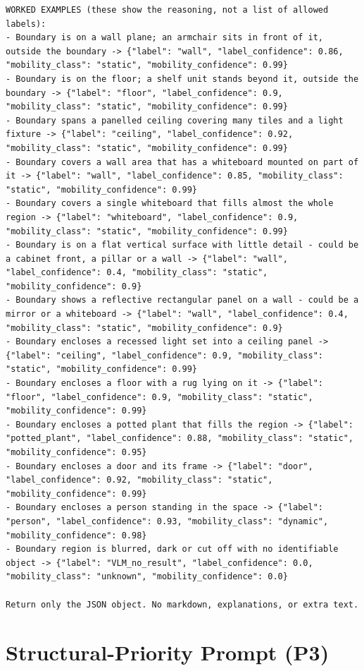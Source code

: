 \begin{lstlisting}[style=promptstyle]
WORKED EXAMPLES (these show the reasoning, not a list of allowed labels):
- Boundary is on a wall plane; an armchair sits in front of it, outside the boundary -> {"label": "wall", "label_confidence": 0.86, "mobility_class": "static", "mobility_confidence": 0.99}
- Boundary is on the floor; a shelf unit stands beyond it, outside the boundary -> {"label": "floor", "label_confidence": 0.9, "mobility_class": "static", "mobility_confidence": 0.99}
- Boundary spans a panelled ceiling covering many tiles and a light fixture -> {"label": "ceiling", "label_confidence": 0.92, "mobility_class": "static", "mobility_confidence": 0.99}
- Boundary covers a wall area that has a whiteboard mounted on part of it -> {"label": "wall", "label_confidence": 0.85, "mobility_class": "static", "mobility_confidence": 0.99}
- Boundary covers a single whiteboard that fills almost the whole region -> {"label": "whiteboard", "label_confidence": 0.9, "mobility_class": "static", "mobility_confidence": 0.99}
- Boundary is on a flat vertical surface with little detail - could be a cabinet front, a pillar or a wall -> {"label": "wall", "label_confidence": 0.4, "mobility_class": "static", "mobility_confidence": 0.9}
- Boundary shows a reflective rectangular panel on a wall - could be a mirror or a whiteboard -> {"label": "wall", "label_confidence": 0.4, "mobility_class": "static", "mobility_confidence": 0.9}
- Boundary encloses a recessed light set into a ceiling panel -> {"label": "ceiling", "label_confidence": 0.9, "mobility_class": "static", "mobility_confidence": 0.99}
- Boundary encloses a floor with a rug lying on it -> {"label": "floor", "label_confidence": 0.9, "mobility_class": "static", "mobility_confidence": 0.99}
- Boundary encloses a potted plant that fills the region -> {"label": "potted_plant", "label_confidence": 0.88, "mobility_class": "static", "mobility_confidence": 0.95}
- Boundary encloses a door and its frame -> {"label": "door", "label_confidence": 0.92, "mobility_class": "static", "mobility_confidence": 0.99}
- Boundary encloses a person standing in the space -> {"label": "person", "label_confidence": 0.93, "mobility_class": "dynamic", "mobility_confidence": 0.98}
- Boundary region is blurred, dark or cut off with no identifiable object -> {"label": "VLM_no_result", "label_confidence": 0.0, "mobility_class": "unknown", "mobility_confidence": 0.0}

Return only the JSON object. No markdown, explanations, or extra text.
\end{lstlisting}

\section{Structural-Priority Prompt (P3)}
\label{app:vlm_prompt_p3}

